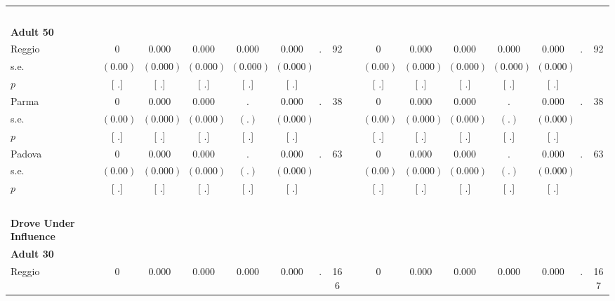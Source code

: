 \begin{longtable}{L{8em} c c c c c c c p{1em} c c c c c c c}
~\\[1em]
\quad \quad \textbf{Adult 50} & & & & & & & & & & & & & & & \\* 
\quad \quad \quad Reggio& 0 &     0.000 &     0.000 &     0.000 &     0.000 &         . &        92 & & 0 &     0.000 &     0.000 &     0.000 &     0.000 &         . &        92  \\*
\quad \quad \quad \quad s.e.& $ (     0.00)$ & $ (    0.000)$ & $ (    0.000)$ & $ (    0.000)$ & $ (    0.000)$ & & & & $ (     0.00)$ & $ (    0.000)$ & $ (    0.000)$ & $ (    0.000)$ & $ (    0.000)$ & &  \\*
\quad \quad \quad \quad $ p$ & [        .] & [        .] & [        .] & [        .] & [        .] & & & & [        .] & [        .] & [        .] & [        .] & [        .] & &  \\[1em]
\quad \quad \quad Parma& 0 &     0.000 &     0.000 &         . &     0.000 &         . &        38 & & 0 &     0.000 &     0.000 &         . &     0.000 &         . &        38  \\*
\quad \quad \quad \quad s.e.& $ (     0.00)$ & $ (    0.000)$ & $ (    0.000)$ & $ (        .)$ & $ (    0.000)$ & & & & $ (     0.00)$ & $ (    0.000)$ & $ (    0.000)$ & $ (        .)$ & $ (    0.000)$ & &  \\*
\quad \quad \quad \quad $ p$ & [        .] & [        .] & [        .] & [        .] & [        .] & & & & [        .] & [        .] & [        .] & [        .] & [        .] & &  \\[1em]
\quad \quad \quad Padova& 0 &     0.000 &     0.000 &         . &     0.000 &         . &        63 & & 0 &     0.000 &     0.000 &         . &     0.000 &         . &        63  \\*
\quad \quad \quad \quad s.e.& $ (     0.00)$ & $ (    0.000)$ & $ (    0.000)$ & $ (        .)$ & $ (    0.000)$ & & & & $ (     0.00)$ & $ (    0.000)$ & $ (    0.000)$ & $ (        .)$ & $ (    0.000)$ & &  \\*
\quad \quad \quad \quad $ p$ & [        .] & [        .] & [        .] & [        .] & [        .] & & & & [        .] & [        .] & [        .] & [        .] & [        .] & &  \\[1em]
~\\[1em]
\textbf{Drove Under Influence} \\*
\quad \quad \textbf{Adult 30} & & & & & & & & & & & & & & & \\* 
\quad \quad \quad Reggio& 0 &     0.000 &     0.000 &     0.000 &     0.000 &         . &       166 & & 0 &     0.000 &     0.000 &     0.000 &     0.000 &         . &       167  \\*

\end{longtable}
